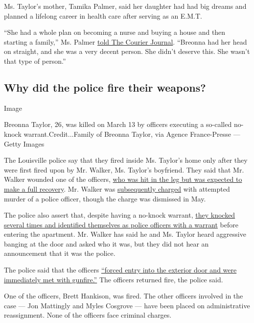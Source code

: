 Ms. Taylor's mother, Tamika Palmer, said her daughter had had big dreams
and planned a lifelong career in health care after serving as an E.M.T.

``She had a whole plan on becoming a nurse and buying a house and then
starting a family,'' Ms. Palmer
\href{https://www.courier-journal.com/story/news/local/2020/05/12/breonna-taylor-case-what-know-louisville-emt-killed-cops/3110066001/}{told
The Courier Journal}. ``Breonna had her head on straight, and she was a
very decent person. She didn't deserve this. She wasn't that type of
person.''

\hypertarget{why-did-the-police-fire-their-weapons}{%
\subsection{Why did the police fire their
weapons?}\label{why-did-the-police-fire-their-weapons}}

Image

Breonna Taylor, 26, was killed on March 13 by officers executing a
so-called no-knock warrant.Credit...Family of Breonna Taylor, via Agence
France-Presse --- Getty Images

The Louisville police say that they fired inside Ms. Taylor's home only
after they were first fired upon by Mr. Walker, Ms. Taylor's boyfriend.
They said that Mr. Walker wounded one of the officers,
\href{https://www.facebook.com/LMPD.ky/videos/206839417221050/}{who was
hit in the leg but was expected to make a full recovery}. Mr. Walker was
\href{https://www.facebook.com/LMPD.ky/videos/206839417221050/}{subsequently
charged} with attempted murder of a police officer, though the charge
was dismissed in May.

The police also assert that, despite having a no-knock warrant,
\href{https://www.facebook.com/LMPD.ky/videos/206839417221050/}{they
knocked several times and identified themselves as police officers with
a warrant} before entering the apartment. Mr. Walker has said he and Ms.
Taylor heard aggressive banging at the door and asked who it was, but
they did not hear an announcement that it was the police.

The police said that the officers
\href{https://www.facebook.com/LMPD.ky/videos/206839417221050/}{``forced
entry into the exterior door and were immediately met with gunfire.''}
The officers returned fire, the police said.

One of the officers, Brett Hankison, was fired. The other officers
involved in the case --- Jon Mattingly and Myles Cosgrove --- have been
placed on administrative reassignment. None of the officers face
criminal charges.


